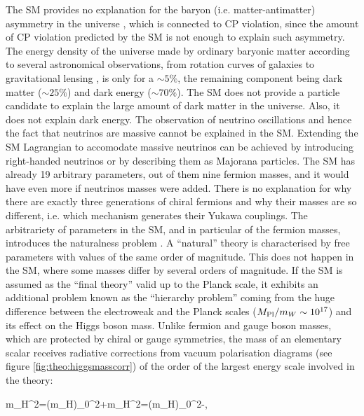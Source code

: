The SM provides no explanation for the baryon (i.e. matter-antimatter) asymmetry in the universe \cite{Sakharov:1967dj}, which is connected to CP violation, since the amount of CP violation predicted by the SM is not enough to explain such asymmetry. The energy density of the universe made by ordinary baryonic matter according to several astronomical observations, from rotation curves of galaxies \cite{Begeman:1991iy} to gravitational lensing \cite{Ade:2013zuv}, is only for a $\sim5\%$, the remaining component being dark matter ($\sim25\%$) and dark energy ($\sim70\%$). The SM does not provide a particle candidate to explain the large amount of dark matter in the universe. Also, it does not explain dark energy. The observation of neutrino oscillations and hence the fact that neutrinos are massive \cite{Fukuda:1998mi} cannot be explained in the SM. Extending the SM Lagrangian to accomodate massive neutrinos can be achieved by introducing right-handed neutrinos or by describing them as Majorana particles.
The SM has already 19 arbitrary parameters, out of them nine fermion masses, and it would have even more if neutrinos masses were added.
There is no explanation for why there are exactly three generations of chiral fermions and why their masses are so different, i.e. which mechanism generates their Yukawa couplings. The arbitrariety of parameters in the SM, and in particular of the fermion masses, introduces the naturalness problem \cite{Giudice:2008bi}. A ``natural'' theory is characterised by free parameters with values of the same order of magnitude. This does not happen in the SM, where some masses differ by several orders of magnitude. If the SM is assumed as the ``final theory'' valid up to the Planck scale, it exhibits an additional problem known as the ``hierarchy problem'' coming from the huge difference between the electroweak and the Planck scales ($M_{\rm Pl}/m_{W}\sim10^{17}$) and its effect on the Higgs boson mass. Unlike fermion and gauge boson masses, which are protected by chiral or gauge symmetries, the mass of an elementary scalar receives radiative corrections from vacuum polarisation diagrams (see figure \ref{fig:theo:higgsmasscorr}) of the order of the largest energy scale involved in the theory:

\be
m_{H}^{2}=(m_{H})_{0}^{2}+\delta m_{H}^{2}=(m_{H})_{0}^{2}-,
\label{sec:theo:eq:higgcorr}
\ee  

